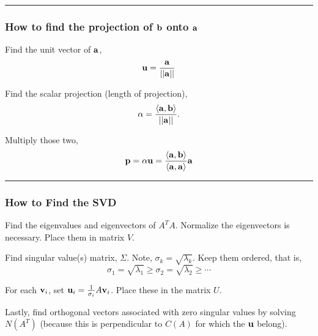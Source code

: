  
\rule[0.001in]{\textwidth}{0.00025in}






 
 \subsubsection*{How to find the projection of ${\bf b}$ onto ${\bf a}$}
 

 \begin{questions}
\question Find the unit vector of ${\bf a}$,  $${\bf u} = \frac{{\bf a}}{|| {\bf a} ||}$$ 

\question Find the scalar projection (length of projection), 
\[ \alpha =  \frac{\langle {\bf a}, {\bf b} \rangle}{||{\bf a} ||} .\]  


\question Multiply those two, 
\[  {\bf p} = \alpha {\bf u} = \frac{\langle {\bf a}, {\bf b} \rangle }{\langle {\bf a}, {\bf a} \rangle} {\bf a}  \] 
\end{questions}
 
 
\rule[0.001in]{\textwidth}{0.00025in}








 
 
 
 \subsubsection*{How to Find the SVD}
 

 \begin{questions}
\question Find the eigenvalues and eigenvectors of $A^TA$.  Normalize the eigenvectors is necessary.  Place them in matrix $V$.  

\question  Find singular value(s) matrix, $\Sigma$.  Note, $\sigma_k = \sqrt{\lambda_k}$.  Keep them ordered, that is, 
 \[ \sigma_1 = \sqrt{\lambda_1}  \ge  \sigma_2 = \sqrt{\lambda_2}  \ge \cdots \]

\question For each ${\bf v}_i$, set ${\bf u}_i = \frac{1}{\sigma_i} A {\bf v}_i$.  Place these in the matrix $U$.  

\question Lastly, find orthogonal vectors associated with zero singular values by solving $N(A^T)$ (because this is perpendicular to $C(A)$ for which the ${\bf u}$ belong).   
 
\end{questions}
 
